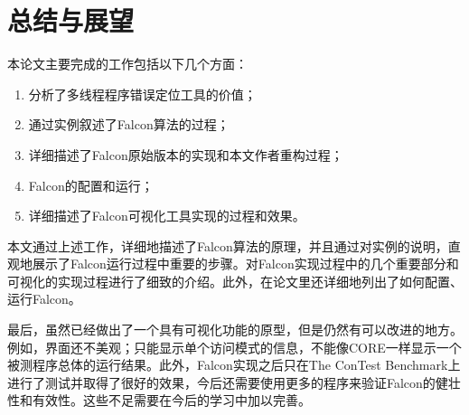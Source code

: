 ﻿\section{总结与展望}
本论文主要完成的工作包括以下几个方面：
\begin{enumerate}
  \item 分析了多线程程序错误定位工具的价值；
  \item 通过实例叙述了Falcon算法的过程；
  \item 详细描述了Falcon原始版本的实现和本文作者重构过程；
  \item Falcon的配置和运行；
  \item 详细描述了Falcon可视化工具实现的过程和效果。
\end{enumerate}\par
本文通过上述工作，详细地描述了Falcon算法的原理，并且通过对实例的说明，直观地展示了Falcon运行过程中重要的步骤。对Falcon实现过程中的几个重要部分和可视化的实现过程进行了细致的介绍。此外，在论文里还详细地列出了如何配置、运行Falcon。\par
最后，虽然已经做出了一个具有可视化功能的原型，但是仍然有可以改进的地方。例如，界面还不美观；只能显示单个访问模式的信息，不能像CORE一样显示一个被测程序总体的运行结果。此外，Falcon实现之后只在The ConTest Benchmark上进行了测试并取得了很好的效果，今后还需要使用更多的程序来验证Falcon的健壮性和有效性。这些不足需要在今后的学习中加以完善。
